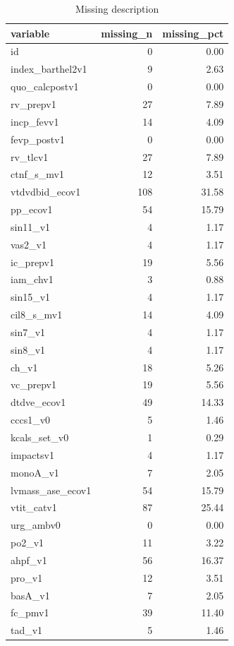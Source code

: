 \documentclass[10pt,a4paper,twoside]{article}\usepackage[]{graphicx}\usepackage[]{xcolor}
\begin{document}
\begin{table}[H]
\centering
\caption{Missing description} 
\label{tab:missing_description}
\begin{tabular}{lrr}
  \hline
variable & missing\_n & missing\_pct \\ 
  \hline
id & 0 & 0.00 \\ 
  index\_barthel2v1 & 9 & 2.63 \\ 
  quo\_calcpostv1 & 0 & 0.00 \\ 
  rv\_prepv1 & 27 & 7.89 \\ 
  incp\_fevv1 & 14 & 4.09 \\ 
  fevp\_postv1 & 0 & 0.00 \\ 
  rv\_tlcv1 & 27 & 7.89 \\ 
  ctnf\_s\_mv1 & 12 & 3.51 \\ 
  vtdvdbid\_ecov1 & 108 & 31.58 \\ 
  pp\_ecov1 & 54 & 15.79 \\ 
  sin11\_v1 & 4 & 1.17 \\ 
  vas2\_v1 & 4 & 1.17 \\ 
  ic\_prepv1 & 19 & 5.56 \\ 
  iam\_chv1 & 3 & 0.88 \\ 
  sin15\_v1 & 4 & 1.17 \\ 
  cil8\_s\_mv1 & 14 & 4.09 \\ 
  sin7\_v1 & 4 & 1.17 \\ 
  sin8\_v1 & 4 & 1.17 \\ 
  ch\_v1 & 18 & 5.26 \\ 
  vc\_prepv1 & 19 & 5.56 \\ 
  dtdve\_ecov1 & 49 & 14.33 \\ 
  cccs1\_v0 & 5 & 1.46 \\ 
  kcals\_set\_v0 & 1 & 0.29 \\ 
  impactsv1 & 4 & 1.17 \\ 
  monoA\_v1 & 7 & 2.05 \\ 
  lvmass\_ase\_ecov1 & 54 & 15.79 \\ 
  vtit\_catv1 & 87 & 25.44 \\ 
  urg\_ambv0 & 0 & 0.00 \\ 
  po2\_v1 & 11 & 3.22 \\ 
  ahpf\_v1 & 56 & 16.37 \\ 
  pro\_v1 & 12 & 3.51 \\ 
  basA\_v1 & 7 & 2.05 \\ 
  fc\_pmv1 & 39 & 11.40 \\ 
  tad\_v1 & 5 & 1.46 \\ 

\end{tabular}
\end{table}
\end{document}
